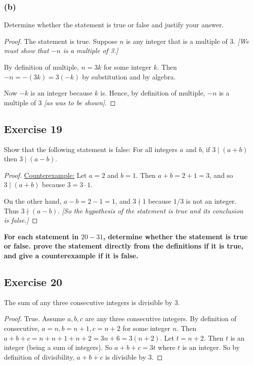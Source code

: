 \documentclass[14pt]{extarticle}
\newcommand{\cy}{\color{cyan}}
\begin{document}
\subsubsection{(b)}
Determine whether the statement is true or false and justify your answer.

\begin{proof}
The statement is true. Suppose $n$ is any integer that is a multiple of 3. {\it [We must show that $-n$ is a multiple of 3.]} 

By definition of multiple, $n = 3k$ for some integer $k$. Then $-n = -(3k) = 3(-k)$ by substitution and by algebra.

Now $-k$ is an integer because $k$ is. Hence, by definition of multiple, $-n$ is a multiple of 3 {\it [as was to be shown]}.
\end{proof}

\subsection{Exercise 19}
Show that the following statement is false: For all integers $a$ and $b$, if $3\mid (a + b)$ then $3 \mid (a - b)$.

\begin{proof}
\underline{Counterexample:} Let $a = 2$ and $b = 1$. Then
$a + b = 2 + 1 = 3$, and so $3 \mid (a + b)$ because $3 = 3\cdot 1$.

On the other hand, $a - b = 2 - 1 = 1$, and $3 \nmid 1$ because $1/3$ is not an integer. Thus $3 \nmid (a - b)$. {\it [So the hypothesis of the statement is true and its conclusion is false.]}
\end{proof}

{\bf \cy For each statement in $20-31$, determine whether the statement is true or false. prove the statement directly from the definitions if it is true, and give a counterexample if it is false.}

\subsection{Exercise 20}
The sum of any three consecutive integers is divisible by 3.

\begin{proof}
True. Assume $a,b,c$ are any three consecutive integers. By definition of consecutive, $a = n, b = n+1, c = n+2$ for some integer $n$. Then $a+b+c = n+n+1+n+2 = 3n+6 = 3(n+2)$. Let $t = n+2$. Then $t$ is an integer (being a sum of integers). So $a+b+c = 3t$ where $t$ is an integer. So by definition of divisibility, $a+b+c$ is divisible by 3.
\end{proof}
\end{document}
